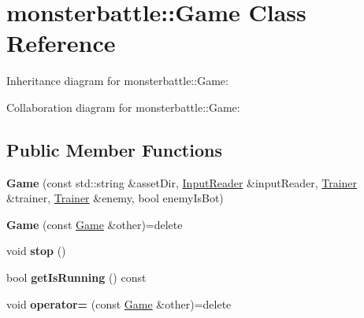 \hypertarget{classmonsterbattle_1_1Game}{}\section{monsterbattle\+:\+:Game Class Reference}
\label{classmonsterbattle_1_1Game}


Inheritance diagram for monsterbattle\+:\+:Game\+:


Collaboration diagram for monsterbattle\+:\+:Game\+:
\subsection*{Public Member Functions}
\begin{DoxyCompactItemize}
\item 
\mbox{\label{classmonsterbattle_1_1Game_ae6d4e0c5fa9ca107480620c4c01439c3}} 
{\bfseries Game} (const std\+::string \&asset\+Dir, \hyperlink{classmonsterbattle_1_1InputReader}{Input\+Reader} \&input\+Reader, \hyperlink{classmonsterbattle_1_1Trainer}{Trainer} \&trainer, \hyperlink{classmonsterbattle_1_1Trainer}{Trainer} \&enemy, bool enemy\+Is\+Bot)
\item 
\mbox{\label{classmonsterbattle_1_1Game_a2079037e0a5cf768d4a3b4de44ee278c}} 
{\bfseries Game} (const \hyperlink{classmonsterbattle_1_1Game}{Game} \&other)=delete
\item 
\mbox{\label{classmonsterbattle_1_1Game_aaa51d9606404f27baec8e6d10af27bef}} 
void {\bfseries stop} ()
\item 
\mbox{\label{classmonsterbattle_1_1Game_a500e6d3bbb6e8ff0d70cff8d70f6716e}} 
bool {\bfseries get\+Is\+Running} () const
\item 
\mbox{\label{classmonsterbattle_1_1Game_ab28b6821c4e2bff118b7201938763a98}} 
void {\bfseries operator=} (const \hyperlink{classmonsterbattle_1_1Game}{Game} \&other)=delete
\end{DoxyCompactItemize}
